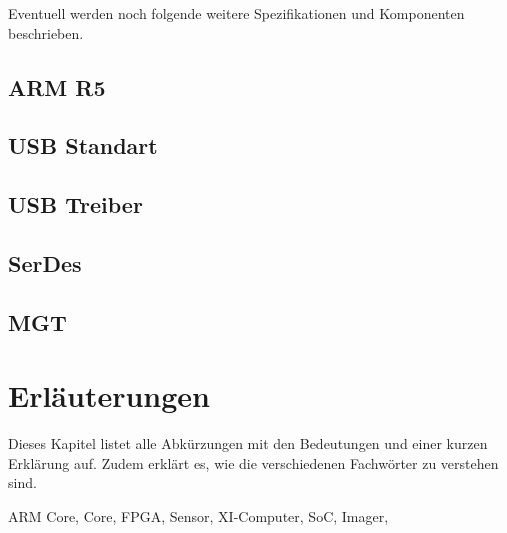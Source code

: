 \documentclass{article}
\begin{document}
Eventuell werden noch folgende weitere Spezifikationen und Komponenten be\-schrieben.
\subsection{ARM R5}
\subsection{USB Standart}
\subsection{USB Treiber}
\subsection{SerDes}
\subsection{MGT}

\section{Erläuterungen}
Dieses Kapitel listet alle Abkürzungen mit den Bedeutungen und einer kurzen Erklärung auf. Zudem erklärt es, wie die verschiedenen Fachwörter zu verstehen sind.

ARM Core,
Core,
FPGA,
Sensor,
XI-Computer,
SoC,
Imager,
\end{document}
